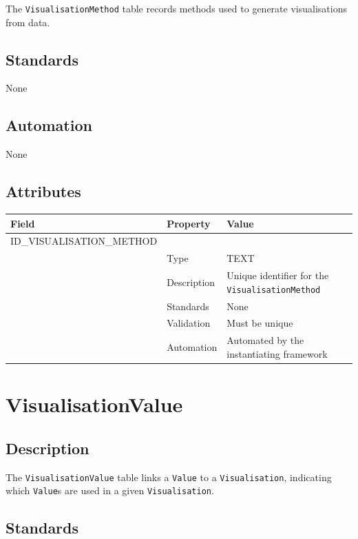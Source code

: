 \documentclass[
]{article}
\newcounter{none}
\begin{document}
The \texttt{VisualisationMethod} table records methods used to generate
visualisations from data.

\subsection{Standards}\label{standards-42}

None

\subsection{Automation}\label{automation-42}

None

\subsection{Attributes}\label{attributes-36}

{\def\LTcaptype{none} 
\begin{longtable}[]{@{}lll@{}}
\toprule\noalign{}
Field & Property & Value \\
\midrule\noalign{}
\endhead
\bottomrule\noalign{}
\endlastfoot
ID\_VISUALISATION\_METHOD & & \\
& Type & TEXT \\
& Description & Unique identifier for the
\texttt{VisualisationMethod} \\
& Standards & None \\
& Validation & Must be unique \\
& Automation & Automated by the instantiating framework \\
\end{longtable}
}

\section{VisualisationValue}\label{visualisationvalue}

\subsection{Description}\label{description-41}

The \texttt{VisualisationValue} table links a \texttt{Value} to a
\texttt{Visualisation}, indicating which \texttt{Value}s are used in a
given \texttt{Visualisation}.

\subsection{Standards}\label{standards-43}
\end{document}
